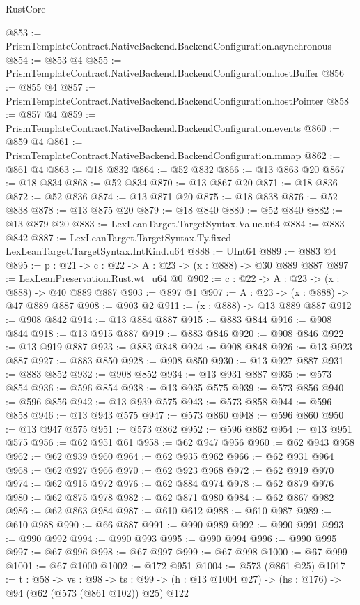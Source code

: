 \begin{lexlean}{RustCore}
\begin{coremodule}
@853 := PrismTemplateContract.NativeBackend.BackendConfiguration.asynchronous
@854 := @853 @4
@855 := PrismTemplateContract.NativeBackend.BackendConfiguration.hostBuffer
@856 := @855 @4
@857 := PrismTemplateContract.NativeBackend.BackendConfiguration.hostPointer
@858 := @857 @4
@859 := PrismTemplateContract.NativeBackend.BackendConfiguration.events
@860 := @859 @4
@861 := PrismTemplateContract.NativeBackend.BackendConfiguration.mmap
@862 := @861 @4
@863 := @18 @832
@864 := @52 @832
@866 := @13 @863 @20
@867 := @18 @834
@868 := @52 @834
@870 := @13 @867 @20
@871 := @18 @836
@872 := @52 @836
@874 := @13 @871 @20
@875 := @18 @838
@876 := @52 @838
@878 := @13 @875 @20
@879 := @18 @840
@880 := @52 @840
@882 := @13 @879 @20
@883 := LexLeanTarget.TargetSyntax.Value.u64
@884 := @883 @842
@887 := LexLeanTarget.TargetSyntax.Ty.fixed LexLeanTarget.TargetSyntax.IntKind.u64
@888 := UInt64
@889 := @883 @4
@895 := {p : @21} -> {c : @22} -> {A : @23} -> (x : @888) -> @30 @889 @887
@897 := LexLeanPreservation.Rust.wt_u64 @0
@902 := {c : @22} -> {A : @23} -> (x : @888) -> @40 @889 @887
@903 := @897 @1
@907 := {A : @23} -> (x : @888) -> @47 @889 @887
@908 := @903 @2
@911 := (x : @888) -> @13 @889 @887
@912 := @908 @842
@914 := @13 @884 @887
@915 := @883 @844
@916 := @908 @844
@918 := @13 @915 @887
@919 := @883 @846
@920 := @908 @846
@922 := @13 @919 @887
@923 := @883 @848
@924 := @908 @848
@926 := @13 @923 @887
@927 := @883 @850
@928 := @908 @850
@930 := @13 @927 @887
@931 := @883 @852
@932 := @908 @852
@934 := @13 @931 @887
@935 := @573 @854
@936 := @596 @854
@938 := @13 @935 @575
@939 := @573 @856
@940 := @596 @856
@942 := @13 @939 @575
@943 := @573 @858
@944 := @596 @858
@946 := @13 @943 @575
@947 := @573 @860
@948 := @596 @860
@950 := @13 @947 @575
@951 := @573 @862
@952 := @596 @862
@954 := @13 @951 @575
@956 := @62 @951 @61
@958 := @62 @947 @956
@960 := @62 @943 @958
@962 := @62 @939 @960
@964 := @62 @935 @962
@966 := @62 @931 @964
@968 := @62 @927 @966
@970 := @62 @923 @968
@972 := @62 @919 @970
@974 := @62 @915 @972
@976 := @62 @884 @974
@978 := @62 @879 @976
@980 := @62 @875 @978
@982 := @62 @871 @980
@984 := @62 @867 @982
@986 := @62 @863 @984
@987 := @610 @612
@988 := @610 @987
@989 := @610 @988
@990 := @66 @887
@991 := @990 @989
@992 := @990 @991
@993 := @990 @992
@994 := @990 @993
@995 := @990 @994
@996 := @990 @995
@997 := @67 @996
@998 := @67 @997
@999 := @67 @998
@1000 := @67 @999
@1001 := @67 @1000
@1002 := @172 @951
@1004 := @573 (@861 @25)
@1017 := {t : @58} ->
  {vs : @98} ->
  {ts : @99} -> (h : @13 @1004 @27) -> (hs : @176) -> @94 (@62 (@573 (@861 @102)) @25) @122

\end{coremodule}
\end{lexlean}
